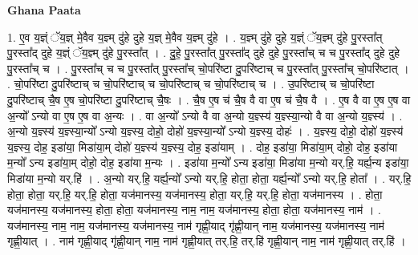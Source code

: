 \documentclass[17pt]{extarticle}
\begin{document}
\textbf{Ghana Paata } \newline

1. ए॒व य॒ज्ञ्ं ॅय॒ज्ञ् मे॒वैव य॒ज्ञ्म् दु॑हे दुहे य॒ज्ञ् मे॒वैव य॒ज्ञ्म् दु॑हे । . य॒ज्ञ्म् दु॑हे दुहे य॒ज्ञ्ं ॅय॒ज्ञ्म् दु॑हे पु॒रस्ता᳚त् पु॒रस्ता᳚द् दुहे य॒ज्ञ्ं ॅय॒ज्ञ्म् दु॑हे पु॒रस्ता᳚त् । . दु॒हे॒ पु॒रस्ता᳚त् पु॒रस्ता᳚द् दुहे दुहे पु॒रस्ता᳚च् च च पु॒रस्ता᳚द् दुहे दुहे पु॒रस्ता᳚च् च । . पु॒रस्ता᳚च् च च पु॒रस्ता᳚त् पु॒रस्ता᳚च् चो॒परि॑ष्टा दु॒परि॑ष्टाच् च पु॒रस्ता᳚त् पु॒रस्ता᳚च् चो॒परि॑ष्टात् । . चो॒परि॑ष्टा दु॒परि॑ष्टाच् च चो॒परि॑ष्टाच् च चो॒परि॑ष्टाच् च चो॒परि॑ष्टाच् च । . उ॒परि॑ष्टाच् च चो॒परि॑ष्टा दु॒परि॑ष्टाच् चै॒ष ए॒ष चो॒परि॑ष्टा दु॒परि॑ष्टाच् चै॒षः । . चै॒ष ए॒ष च॑ चै॒ष वै वा ए॒ष च॑ चै॒ष वै । . ए॒ष वै वा ए॒ष ए॒ष वा अ॒न्यो᳚ ऽन्यो वा ए॒ष ए॒ष वा अ॒न्यः । . वा अ॒न्यो᳚ ऽन्यो वै वा अ॒न्यो य॒ज्ञ्स्य॑ य॒ज्ञ्स्या॒न्यो वै वा अ॒न्यो य॒ज्ञ्स्य॑ । . अ॒न्यो य॒ज्ञ्स्य॑ य॒ज्ञ्स्या॒न्यो᳚ ऽन्यो य॒ज्ञ्स्य॒ दोहो॒ दोहो॑ य॒ज्ञ्स्या॒न्यो᳚ ऽन्यो य॒ज्ञ्स्य॒ दोहः॑ । . य॒ज्ञ्स्य॒ दोहो॒ दोहो॑ य॒ज्ञ्स्य॑ य॒ज्ञ्स्य॒ दोह॒ इडा॑या॒ मिडा॑या॒म् दोहो॑ य॒ज्ञ्स्य॑ य॒ज्ञ्स्य॒ दोह॒ इडा॑याम् । . दोह॒ इडा॑या॒ मिडा॑या॒म् दोहो॒ दोह॒ इडा॑या म॒न्यो᳚ ऽन्य इडा॑या॒म् दोहो॒ दोह॒ इडा॑या म॒न्यः । . इडा॑या म॒न्यो᳚ ऽन्य इडा॑या॒ मिडा॑या म॒न्यो यर्.हि॒ यर्ह्य॒न्य इडा॑या॒ मिडा॑या म॒न्यो यर्.हि॑ । . अ॒न्यो यर्.हि॒ यर्ह्य॒न्यो᳚ ऽन्यो यर्.हि॒ होता॒ होता॒ यर्ह्य॒न्यो᳚ ऽन्यो यर्.हि॒ होता᳚ । . यर्.हि॒ होता॒ होता॒ यर्.हि॒ यर्.हि॒ होता॒ यज॑मानस्य॒ यज॑मानस्य॒ होता॒ यर्.हि॒ यर्.हि॒ होता॒ यज॑मानस्य । . होता॒ यज॑मानस्य॒ यज॑मानस्य॒ होता॒ होता॒ यज॑मानस्य॒ नाम॒ नाम॒ यज॑मानस्य॒ होता॒ होता॒ यज॑मानस्य॒ नाम॑ । . यज॑मानस्य॒ नाम॒ नाम॒ यज॑मानस्य॒ यज॑मानस्य॒ नाम॑ गृह्णी॒याद् गृ॑ह्णी॒यान् नाम॒ यज॑मानस्य॒ यज॑मानस्य॒ नाम॑ गृह्णी॒यात् । . नाम॑ गृह्णी॒याद् गृ॑ह्णी॒यान् नाम॒ नाम॑ गृह्णी॒यात् तर्.हि॒ तर्.हि॑ गृह्णी॒यान् नाम॒ नाम॑ गृह्णी॒यात् तर्.हि॑ । \newline
\end{document}
